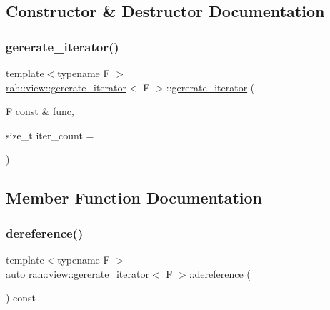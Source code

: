 \subsection{Constructor \& Destructor Documentation}
\mbox{\label{structrah_1_1view_1_1gererate__iterator_a4fc4cf21eac55d6ffde930c781200256}} 
\subsubsection{\texorpdfstring{gererate\_iterator()}{gererate\_iterator()}}
{\footnotesize\ttfamily template$<$typename F $>$ \\
\mbox{\hyperlink{structrah_1_1view_1_1gererate__iterator}{rah\+::view\+::gererate\+\_\+iterator}}$<$ F $>$\+::\mbox{\hyperlink{structrah_1_1view_1_1gererate__iterator}{gererate\+\_\+iterator}} (\begin{DoxyParamCaption}\item[{F const \&}]{func,  }\item[{size\+\_\+t}]{iter\+\_\+count = {} }\end{DoxyParamCaption})\hspace{0.3cm}{\ttfamily [inline]}}



\subsection{Member Function Documentation}
\mbox{\label{structrah_1_1view_1_1gererate__iterator_abc6f805627089f90408143d73d2f4227}} 
\subsubsection{\texorpdfstring{dereference()}{dereference()}}
{\footnotesize\ttfamily template$<$typename F $>$ \\
auto \mbox{\hyperlink{structrah_1_1view_1_1gererate__iterator}{rah\+::view\+::gererate\+\_\+iterator}}$<$ F $>$\+::dereference (\begin{DoxyParamCaption}{ }\end{DoxyParamCaption}) const\hspace{0.3cm}{\ttfamily [inline]}}

